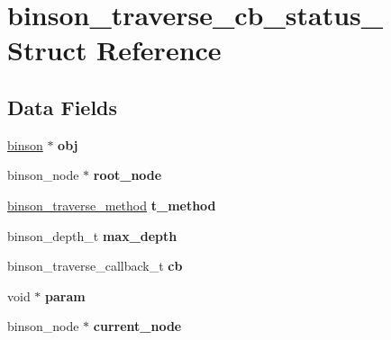 \hypertarget{structbinson__traverse__cb__status__}{\section{binson\-\_\-traverse\-\_\-cb\-\_\-status\-\_\- Struct Reference}
\label{structbinson__traverse__cb__status__}
}
\subsection*{Data Fields}
\begin{DoxyCompactItemize}
\item 
\hypertarget{structbinson__traverse__cb__status___a1996619641394641093723bbfe4f821a}{\hyperlink{structbinson__}{binson} $\ast$ {\bfseries obj}}\label{structbinson__traverse__cb__status___a1996619641394641093723bbfe4f821a}

\item 
\hypertarget{structbinson__traverse__cb__status___ae4230e6506e696c6491c95a5fe5ecbe5}{binson\-\_\-node $\ast$ {\bfseries root\-\_\-node}}\label{structbinson__traverse__cb__status___ae4230e6506e696c6491c95a5fe5ecbe5}

\item 
\hypertarget{structbinson__traverse__cb__status___aa769d1ecb6e5e8feb758fb08634c7233}{\hyperlink{binson_8h_afd64bb93284c9a93185ff16f28c8a38f}{binson\-\_\-traverse\-\_\-method} {\bfseries t\-\_\-method}}\label{structbinson__traverse__cb__status___aa769d1ecb6e5e8feb758fb08634c7233}

\item 
\hypertarget{structbinson__traverse__cb__status___af63a4aad99cab0051e23360be96d2234}{binson\-\_\-depth\-\_\-t {\bfseries max\-\_\-depth}}\label{structbinson__traverse__cb__status___af63a4aad99cab0051e23360be96d2234}

\item 
\hypertarget{structbinson__traverse__cb__status___a2d3ab7fe232318012801ba091b3c13bd}{binson\-\_\-traverse\-\_\-callback\-\_\-t {\bfseries cb}}\label{structbinson__traverse__cb__status___a2d3ab7fe232318012801ba091b3c13bd}

\item 
\hypertarget{structbinson__traverse__cb__status___a13623f1d68513495c21f8b061b1a5aec}{void $\ast$ {\bfseries param}}\label{structbinson__traverse__cb__status___a13623f1d68513495c21f8b061b1a5aec}

\item 
\hypertarget{structbinson__traverse__cb__status___a638944cf6f9c15e32be05b28e6f77369}{binson\-\_\-node $\ast$ {\bfseries current\-\_\-node}}\label{structbinson__traverse__cb__status___a638944cf6f9c15e32be05b28e6f77369}


\end{DoxyCompactItemize}
